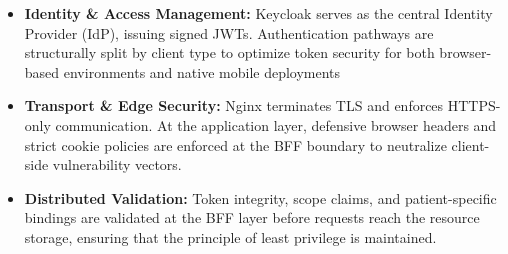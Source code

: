 \begin{itemize}
    \item \textbf{Identity \& Access Management:} Keycloak serves as the central Identity Provider (IdP), issuing signed \acp{JWT}. 
    Authentication pathways are structurally split by client type to optimize token security for both browser-based environments and native mobile deployments
    \item \textbf{Transport \& Edge Security:} Nginx terminates TLS and enforces HTTPS-only communication. 
    At the application layer, defensive browser headers and strict cookie policies are enforced at the BFF boundary to neutralize client-side vulnerability vectors.
    \item \textbf{Distributed Validation:} Token integrity, scope claims, and patient-specific bindings are validated at the BFF layer before requests reach the resource storage, ensuring that the principle of least privilege is maintained.
\end{itemize}







